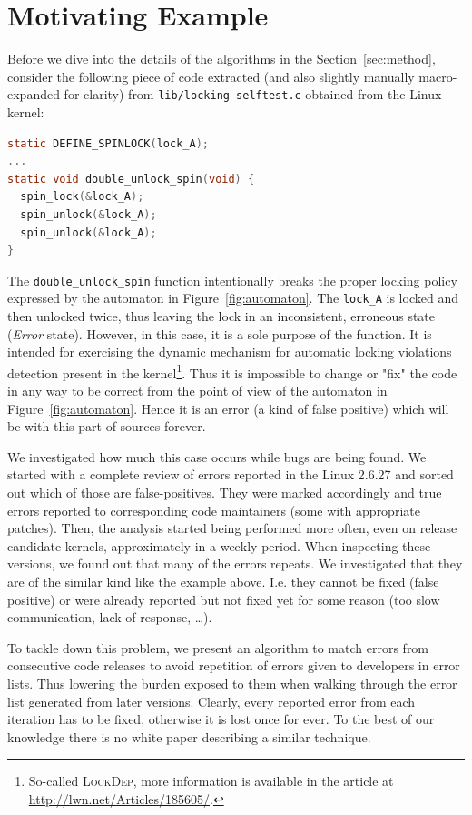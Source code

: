 \documentclass{acm_proc_article-sp}
\begin{document}
\section{Motivating Example}
\label{sec:motiv}
Before we dive into the details of the algorithms in the
Section~\ref{sec:method}, consider the following piece of code extracted
(and also slightly manually macro-expanded for clarity) from
\texttt{lib/locking-selftest.c} obtained from the Linux kernel:
\begin{center}
\begin{lstlisting}[language=C]
static DEFINE_SPINLOCK(lock_A);
...
static void double_unlock_spin(void) {
  spin_lock(&lock_A);
  spin_unlock(&lock_A);
  spin_unlock(&lock_A);
}
\end{lstlisting}
\end{center}

The \texttt{double\_unlock\_spin} function intentionally breaks the proper
locking policy expressed by the automaton in Figure~\ref{fig:automaton}. The
\texttt{lock\_A} is locked and then unlocked twice, thus leaving the lock in
an inconsistent, erroneous state (\emph{Error} state). However, in this case,
it is a sole purpose of the function. It is intended for exercising the
dynamic mechanism for automatic locking violations detection present in the
kernel\footnote{So-called \textsc{LockDep}, more information is available in
the article at \url{http://lwn.net/Articles/185605/}.}. Thus it is impossible
to change or "fix" the code in any way to be correct from the point of view of
the automaton in Figure~\ref{fig:automaton}. Hence it is an error (a kind of
false positive) which will be with this part of sources forever.

We investigated how much this case occurs while bugs are being found.  We
started with a complete review of errors reported in the Linux 2.6.27 and
sorted out which of those are false-positives. They were marked accordingly
and true errors reported to corresponding code maintainers (some with
appropriate patches). Then, the analysis started being performed more often,
even on release candidate kernels, approximately in a weekly period. When
inspecting these versions, we found out that many of the errors repeats.
We investigated that they are of the similar kind like the example above.
I.e. they cannot be fixed (false positive) or were already reported but not
fixed yet for some reason (too slow communication, lack of response, \ldots).

To tackle down this problem, we present an algorithm to match errors from
consecutive code releases to avoid repetition of errors given to developers in
error lists. Thus lowering the burden exposed to them when walking through the
error list generated from later versions. Clearly, every reported error from
each iteration has to be fixed, otherwise it is lost once for ever. To the
best of our knowledge there is no white paper describing a similar technique.
\end{document}
